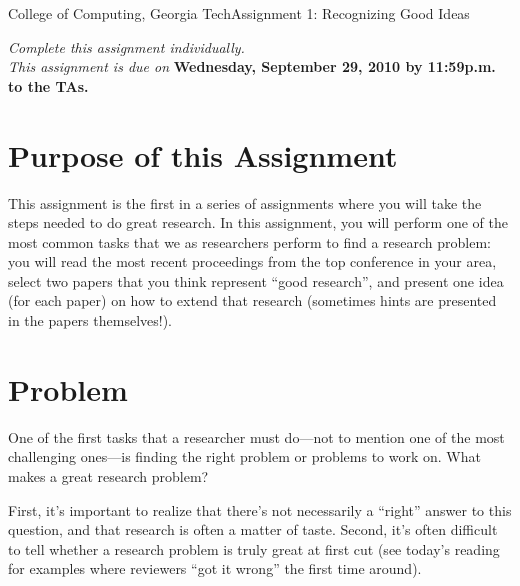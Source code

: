 \documentclass[11pt]{article}
\begin{document}


{College of Computing, Georgia Tech}{Assignment 1: Recognizing Good Ideas}

{\em Complete this assignment individually. \\ This assignment is due
  on} {\bf Wednesday, September 29, 2010 by 11:59p.m. to the TAs.}

\section{Purpose of this Assignment}

This assignment is the first in a series of assignments where you will
take the steps needed to do great research.  In this assignment, you
will perform one of the most common tasks that we as researchers perform
to find a research problem: you will read the most recent proceedings
from the top conference in your area, select two papers that you think
represent ``good research'', and present one idea (for each paper) on
how to extend that research (sometimes hints are presented in the papers
themselves!).


\section{Problem}


One of the first tasks that a researcher must do---not to mention one of
the most challenging ones---is finding the right problem or problems to
work on.  What makes a great research problem?  

First, it's important to realize that there's not necessarily a
``right'' answer to this question, and that research is often a matter
of taste.  Second, it's often difficult to tell whether a research
problem is truly great at first cut (see today's reading for examples
where reviewers ``got it wrong'' the first time around).
\end{document}
